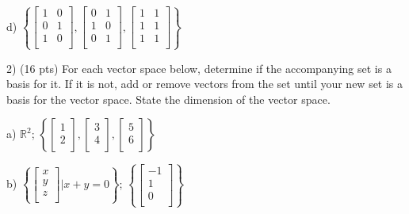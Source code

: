 \documentclass{article}
\begin{document}
\begin{flushleft}
d) $\left\{\begin{bmatrix} 1&0\\0&1\\1&0\\ \end{bmatrix}, \begin{bmatrix} 0&1\\1&0\\0&1\\ \end{bmatrix}, \begin{bmatrix} 1&1\\1&1\\1&1\\ \end{bmatrix} \right\}$

\pagebreak

2) (16 pts) For each vector space below, determine if the accompanying set is a basis for it.  If it is not, add or remove vectors from the set until your new set is a basis for the vector space.  State the dimension of the vector space.

\vspace{0.2in}

a) $\mathbb{R}^2$; \hspace{0.1in} $\left\{\begin{bmatrix} 1\\2\\\end{bmatrix}, \begin{bmatrix} 3\\4\\\end{bmatrix}, \begin{bmatrix} 5\\6\\\end{bmatrix} \right\}$

\vspace{2in}

b) $\left\{ \begin{bmatrix} x\\y\\z\\\end{bmatrix} | x+y=0 \right\}$; \hspace{0.1in} $\left\{ \begin{bmatrix} -1\\1\\0\\\end{bmatrix} \right\}$


\end{flushleft}
\end{document}
